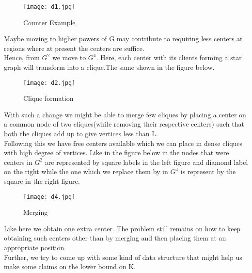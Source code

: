 \documentclass[12pt,a4paper,onecolumn]{article}
\begin{document}
\begin{itemize}
\begin{figure}[H]
\begin{center}
\texttt{[image: d1.jpg]}
  \caption{Counter Example}
  \label{Figure 12}
\end{center}
\end{figure} Maybe moving to higher powers of G may contribute to requiring less centers at regions where at present the centers are suffice.\\Hence, from $G^2$ we move to $G^4$. Here, each center with its clients forming a star graph will transform into a clique.The same shown in the figure below.\begin{figure}[H]
\begin{center}
\texttt{[image: d2.jpg]}
  \caption{Clique formation}
  \label{Figure 10}
\end{center}
\end{figure} With such a change we might be able to merge few cliques by placing a center on a common node of two cliques(while removing their respective centers) such that both the cliques add up to give vertices less than L. \\
Following this we have free centers available which we can place in dense cliques with high degree of vertices. Like in the figure below in the nodes that were centers in $G^2$ are represented by square labels in the left figure and diamond label on the right while the one which we replace them by in $G^4$ is represent by the square in the right figure.
\begin{figure}[H]
\begin{center}
\texttt{[image: d4.jpg]}
  \caption{Merging}
  \label{Figure 11}
\end{center}
\end{figure}
Like here we obtain one extra center. The problem still remains on how to keep obtaining such centers other than by merging and then placing them at an appropriate position.\\
Further, we try to come up with some kind of data structure that might help us make some claims on the lower bound on K. \begin{figure}


\end{figure}
\end{itemize}
\end{document}
